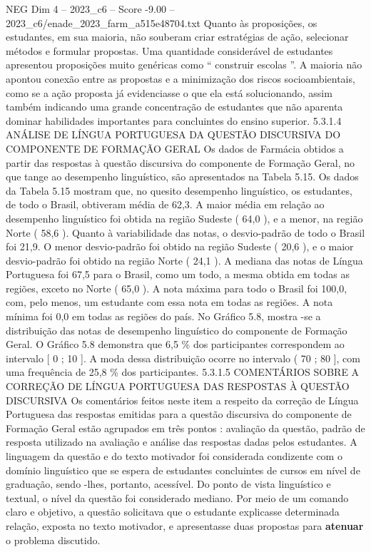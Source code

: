 \begin{textsample}{NEG Dim 4 – 2023\_c6 – Score -9.00 – 2023\_c6/enade\_2023\_farm\_a515e48704.txt}
Quanto às proposições, os estudantes, em sua maioria, não souberam criar estratégias de ação, selecionar métodos e formular propostas.
Uma quantidade considerável de estudantes apresentou proposições muito genéricas como “ construir escolas ”.
A maioria não apontou conexão entre as propostas e a minimização dos riscos socioambientais, como se a ação proposta já evidenciasse o que ela está solucionando, assim também indicando uma grande concentração de estudantes que não aparenta dominar habilidades importantes para concluintes do ensino superior. 5.3.1.4 ANÁLISE DE LÍNGUA PORTUGUESA DA QUESTÃO DISCURSIVA DO COMPONENTE DE FORMAÇÃO GERAL Os dados de Farmácia obtidos a partir das respostas à questão discursiva do componente de Formação Geral, no que tange ao desempenho linguístico, são apresentados na Tabela 5.15.
Os dados da Tabela 5.15 mostram que, no quesito desempenho linguístico, os estudantes, de todo o Brasil, obtiveram média de 62,3.
A maior média em relação ao desempenho linguístico foi obtida na região Sudeste ( 64,0 ), e a menor, na região Norte ( 58,6 ).
Quanto à variabilidade das notas, o desvio-padrão de todo o Brasil foi 21,9.
O menor desvio-padrão foi obtido na região Sudeste ( 20,6 ), e o maior desvio-padrão foi obtido na região Norte ( 24,1 ).
A mediana das notas de Língua Portuguesa foi 67,5 para o Brasil, como um todo, a mesma obtida em todas as regiões, exceto no Norte ( 65,0 ).
A nota máxima para todo o Brasil foi 100,0, com, pelo menos, um estudante com essa nota em todas as regiões.
A nota mínima foi 0,0 em todas as regiões do país.
No Gráfico 5.8, mostra -se a distribuição das notas de desempenho linguístico do componente de Formação Geral.
O Gráfico 5.8 demonstra que 6,5 \% dos participantes correspondem ao intervalo [ 0 ; 10 ].
A moda dessa distribuição ocorre no intervalo ( 70 ; 80 ], com uma frequência de 25,8 \% dos participantes. 5.3.1.5 COMENTÁRIOS SOBRE A CORREÇÃO DE LÍNGUA PORTUGUESA DAS RESPOSTAS À QUESTÃO DISCURSIVA Os comentários feitos neste item a respeito da correção de Língua Portuguesa das respostas emitidas para a questão discursiva do componente de Formação Geral estão agrupados em três pontos : avaliação da questão, padrão de resposta utilizado na avaliação e análise das respostas dadas pelos estudantes.
A linguagem da questão e do texto motivador foi considerada condizente com o domínio linguístico que se espera de estudantes concluintes de cursos em nível de graduação, sendo -lhes, portanto, acessível.
Do ponto de vista linguístico e textual, o nível da questão foi considerado mediano.
Por meio de um comando claro e objetivo, a questão solicitava que o estudante explicasse determinada relação, exposta no texto motivador, e apresentasse duas propostas para \textbf{atenuar} o problema discutido.

\end{textsample}
